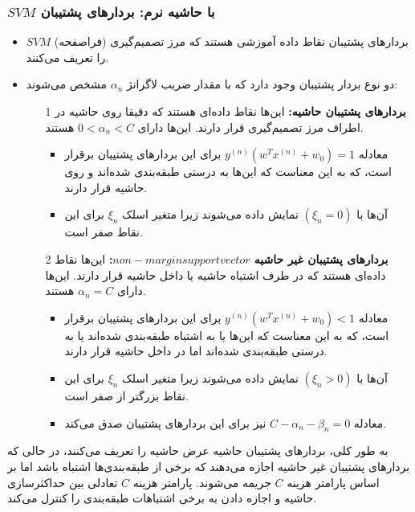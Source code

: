 \documentclass[12pt]{article}
\begin{document}
\begin{frame}
\frametitle{\textbf{$SVM$ با حاشیه نرم: بردارهای پشتیبان}}

\begin{itemize}
    \item بردارهای پشتیبان نقاط داده آموزشی هستند که مرز تصمیم‌گیری (فراصفحه) $SVM$ را تعریف می‌کنند.
    
    \item دو نوع بردار پشتیبان وجود دارد که با مقدار ضریب لاگرانژ $\alpha_n$ مشخص می‌شوند:
    
        \begin{itemize}
           \item[1]  \textbf{بردارهای پشتیبان حاشیه:} این‌ها نقاط داده‌ای هستند که دقیقا روی حاشیه در اطراف مرز تصمیم‌گیری قرار دارند. این‌ها دارای $0 < \alpha_n < C$ هستند.
            
                \begin{itemize}
                    \item معادله $y^{(n)}(w^{T}x^{(n)} + w_{0}) = 1$ برای این بردارهای پشتیبان برقرار است، که به این معناست که این‌ها به درستی طبقه‌بندی شده‌اند و روی حاشیه قرار دارند.
                    
                    \item آن‌ها با $(\xi_n = 0)$ نمایش داده می‌شوند زیرا متغیر اسلک $\xi_n$ برای این نقاط صفر است.
                \end{itemize}
                
            \item[2]  \textbf{بردارهای پشتیبان غیر حاشیه $non-margin support vector$:} این‌ها نقاط داده‌ای هستند که در طرف اشتباه حاشیه یا داخل حاشیه قرار دارند. این‌ها دارای $\alpha_n = C$ هستند.
            
                \begin{itemize}
                    \item معادله $y^{(n)}(w^{T}x^{(n)} + w_{0}) < 1$ برای این بردارهای پشتیبان برقرار است، که به این معناست که این‌ها یا به اشتباه طبقه‌بندی شده‌اند یا به درستی طبقه‌بندی شده‌اند اما در داخل حاشیه قرار دارند.
                    
                    \item آن‌ها با $(\xi_n > 0)$ نمایش داده می‌شوند زیرا متغیر اسلک $\xi_n$ برای این نقاط بزرگتر از صفر است.
                    
                    \item معادله $C - \alpha_n - \beta_n = 0$ نیز برای این بردارهای پشتیبان صدق می‌کند.
                \end{itemize}
        \end{itemize}
    \end{itemize}

به طور کلی، بردارهای پشتیبان حاشیه عرض حاشیه را تعریف می‌کنند، در حالی که بردارهای پشتیبان غیر حاشیه اجازه می‌دهند که برخی از طبقه‌بندی‌ها اشتباه باشد اما بر اساس پارامتر هزینه $C$ جریمه می‌شوند. پارامتر هزینه $C$ تعادلی بین حداکثرسازی حاشیه و اجازه دادن به برخی اشتباهات طبقه‌بندی را کنترل می‌کند.

\end{frame}
\end{document}
